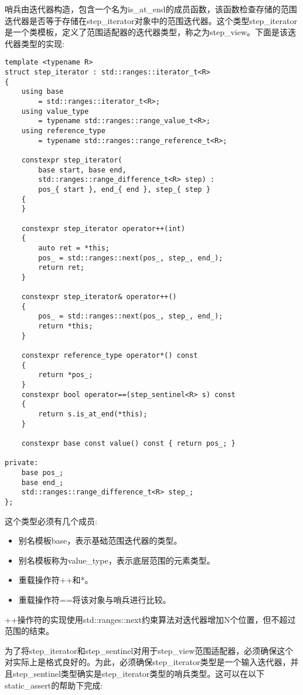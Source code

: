 哨兵由迭代器构造，包含一个名为is\_at\_end的成员函数，该函数检查存储的范围迭代器是否等于存储在step\_iterator对象中的范围迭代器。这个类型step\_iterator是一个类模板，定义了范围适配器的迭代器类型，称之为step\_view。下面是该迭代器类型的实现:

\begin{lstlisting}[style=styleCXX]
template <typename R>
struct step_iterator : std::ranges::iterator_t<R>
{
	using base
		= std::ranges::iterator_t<R>;
	using value_type
		= typename std::ranges::range_value_t<R>;
	using reference_type
		= typename std::ranges::range_reference_t<R>;
		
	constexpr step_iterator(
		base start, base end,
		std::ranges::range_difference_t<R> step) :
		pos_{ start }, end_{ end }, step_{ step }
	{
	}

	constexpr step_iterator operator++(int)
	{
		auto ret = *this;
		pos_ = std::ranges::next(pos_, step_, end_);
		return ret;
	}

	constexpr step_iterator& operator++()
	{
		pos_ = std::ranges::next(pos_, step_, end_);
		return *this;
	}

	constexpr reference_type operator*() const
	{
		return *pos_;
	}
	constexpr bool operator==(step_sentinel<R> s) const
	{
		return s.is_at_end(*this);
	}

	constexpr base const value() const { return pos_; }
	
private:
	base pos_;
	base end_;
	std::ranges::range_difference_t<R> step_;
};
\end{lstlisting}

这个类型必须有几个成员:

\begin{itemize}
\item
别名模板base，表示基础范围迭代器的类型。

\item
别名模板称为value\_type，表示底层范围的元素类型。

\item
重载操作符++和*。

\item
重载操作符==将该对象与哨兵进行比较。
\end{itemize}

++操作符的实现使用std::ranges::next约束算法对迭代器增加N个位置，但不超过范围的结束。

为了将step\_iterator和step\_sentinel对用于step\_view范围适配器，必须确保这个对实际上是格式良好的。为此，必须确保step\_iterator类型是一个输入迭代器，并且step\_sentinel类型确实是step\_iterator类型的哨兵类型。这可以在以下static\_assert的帮助下完成:


